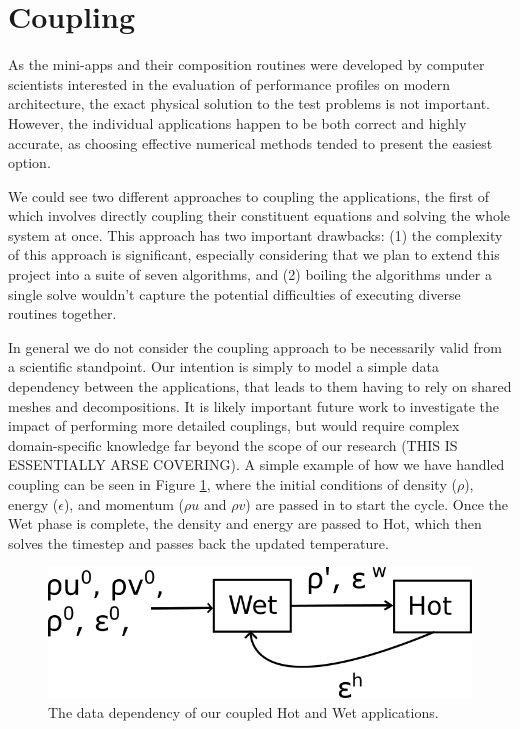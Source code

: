 \documentclass[runningheads,a4paper]{llncs}
\begin{document}
\section{Coupling}

As the mini-apps and their composition routines were developed by computer scientists interested in the evaluation of performance profiles on modern architecture, the exact physical solution to the test problems is not important. However, the individual applications happen to be both correct and highly accurate, as choosing effective numerical methods tended to present the easiest option. 

We could see two different approaches to coupling the applications, the first of which involves directly coupling their constituent equations and solving the whole system at once. This approach has two important drawbacks: (1) the complexity of this approach is significant, especially considering that we plan to extend this project into a suite of seven algorithms, and (2) boiling the algorithms under a single solve wouldn't capture the potential difficulties of executing diverse routines together.


In general we do not consider the coupling approach to be necessarily valid from a scientific standpoint. Our intention is simply to model a simple data dependency between the applications, that leads to them having to rely on shared meshes and decompositions. It is likely important future work to investigate the impact of performing more detailed couplings, but would require complex domain-specific knowledge far beyond the scope of our research (THIS IS ESSENTIALLY ARSE COVERING). A simple example of how we have handled coupling can be seen in Figure \ref{fig:hot-wet-flow}, where the initial conditions of density ($\rho$), energy ($\epsilon$), and momentum ($\rho u$ and $\rho v$) are passed in to start the cycle. Once the Wet phase is complete, the density and energy are passed to Hot, which then solves the timestep and passes back the updated temperature.

\begin{figure}
  \centering
  \includegraphics[width=0.6\linewidth]{hot-wet-flow}
  \caption{The data dependency of our coupled Hot and Wet applications.}
  \label{fig:hot-wet-flow}
\end{figure}
\end{document}
